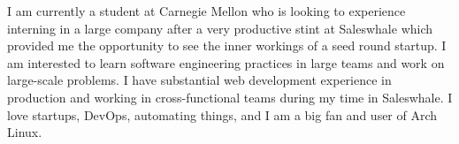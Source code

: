 

\begin{cvparagraph}

  I am currently a student at Carnegie Mellon who is looking to experience interning in a large company after a very productive stint at Saleswhale which provided me the opportunity to see the inner workings of a seed round startup. I am interested to learn software engineering practices in large teams and work on large-scale problems. I have substantial web development experience in production and working in cross-functional teams during my time in Saleswhale. I love startups, DevOps, automating things, and I am a big fan and user of Arch Linux.
\end{cvparagraph}
